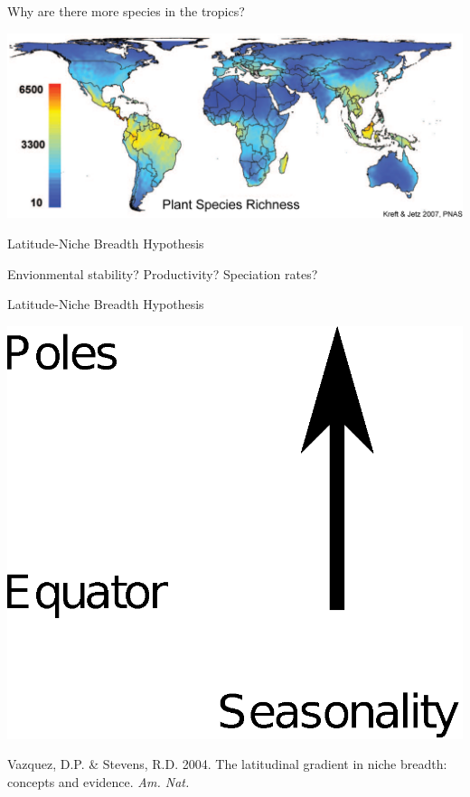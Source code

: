 \documentclass{beamer}
\begin{document}
  \begin{frame}{Why are there more species in the tropics?}

    \begin{center}
      \includegraphics*[width=.8\textwidth]{Figures/plant_richness.eps}


      \vspace{.5cm}

      {\Large Latitude-Niche Breadth Hypothesis}

      \vspace{.5cm}

      {\color{purple}Envionmental stability? Productivity?}
      Speciation rates?

      \vspace{1cm}

    \end{center}
  \end{frame}


  \begin{frame}{Latitude-Niche Breadth Hypothesis}

    \begin{center}
      \includegraphics[width=.8\textwidth]{Figures/latitude_niche_breadth_1.eps}
    \end{center}

    \vspace{1.5cm}

    \tiny{Vazquez, D.P. \& Stevens, R.D. 2004. The latitudinal gradient in niche breadth: concepts and evidence. \emph{Am. Nat.}}
  \end{frame}
\end{document}
